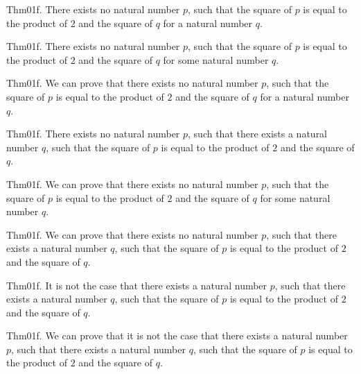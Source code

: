\documentclass{article}
\begin{document}
Thm01f. There exists no natural number $p$, such that the square of $p$ is equal to the product of $2$ and the square of $q$ for a natural number $q$.

Thm01f. There exists no natural number $p$, such that the square of $p$ is equal to the product of $2$ and the square of $q$ for some natural number $q$.

Thm01f. We can prove that there exists no natural number $p$, such that the square of $p$ is equal to the product of $2$ and the square of $q$ for a natural number $q$.

Thm01f. There exists no natural number $p$, such that there exists a natural number $q$, such that the square of $p$ is equal to the product of $2$ and the square of $q$.

Thm01f. We can prove that there exists no natural number $p$, such that the square of $p$ is equal to the product of $2$ and the square of $q$ for some natural number $q$.

Thm01f. We can prove that there exists no natural number $p$, such that there exists a natural number $q$, such that the square of $p$ is equal to the product of $2$ and the square of $q$.

Thm01f. It is not the case that there exists a natural number $p$, such that there exists a natural number $q$, such that the square of $p$ is equal to the product of $2$ and the square of $q$.

Thm01f. We can prove that it is not the case that there exists a natural number $p$, such that there exists a natural number $q$, such that the square of $p$ is equal to the product of $2$ and the square of $q$.
\end{document}
